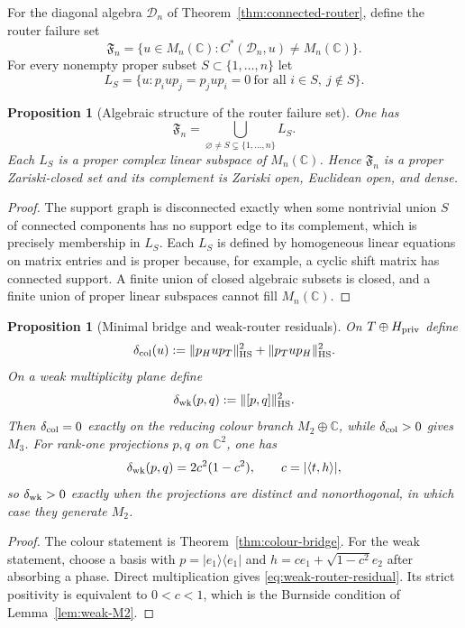 \documentclass[11pt]{article}
\newtheorem{proposition}[theorem]{Proposition}
\theoremstyle{definition}
\theoremstyle{remark}
\newcommand{\C}{\mathbb C}
\newcommand{\HS}{\mathrm{HS}}
\newcommand{\norm}[1]{\lVert#1\rVert}
\newcommand{\abs}[1]{\lvert#1\rvert}
\begin{document}
For the diagonal algebra $\mathcal D_n$ of
Theorem~\ref{thm:connected-router}, define the router failure set
\[
\mathfrak F_n
=
\{u\in M_n(\C):C^*(\mathcal D_n,u)\ne M_n(\C)\}.
\]
For every nonempty proper subset $S\subset\{1,\ldots,n\}$ let
\[
L_S
=
\{u:p_iup_j=p_jup_i=0\ \text{for all }i\in S,
\ j\notin S\}.
\]

\begin{proposition}[Algebraic structure of the router failure set]
\label{prop:router-failure-locus}
One has
\begin{equation}
\boxed{
\mathfrak F_n
=
\bigcup_{\varnothing\ne S\subsetneq\{1,\ldots,n\}}L_S.}
\label{eq:router-failure-locus}
\end{equation}
Each $L_S$ is a proper complex linear subspace of $M_n(\C)$.  Hence
$\mathfrak F_n$ is a proper Zariski-closed set and its complement is Zariski
open, Euclidean open, and dense.
\end{proposition}

\begin{proof}
The support graph is disconnected exactly when some nontrivial union $S$ of
connected components has no support edge to its complement, which is precisely
membership in $L_S$.  Each $L_S$ is defined by homogeneous linear equations
on matrix entries and is proper because, for example, a cyclic shift matrix
has connected support.  A finite union of closed algebraic subsets is closed,
and a finite union of proper linear subspaces cannot fill $M_n(\C)$.
\end{proof}

\begin{proposition}[Minimal bridge and weak-router residuals]
\label{prop:bridge-router-residuals}
On $T\oplus H_{\rm priv}$ define
\[
\delta_{\rm col}(u)
:=
\norm{p_Hup_T}_{\HS}^2+\norm{p_Tup_H}_{\HS}^2.
\]
On a weak multiplicity plane define
\[
\delta_{\rm wk}(p,q):=\norm{[p,q]}_{\HS}^2.
\]
Then $\delta_{\rm col}=0$ exactly on the reducing colour branch
$M_2\oplus\C$, while $\delta_{\rm col}>0$ gives $M_3$.  For rank-one
projections $p,q$ on $\C^2$, one has
\begin{equation}
\delta_{\rm wk}(p,q)
=2c^2(1-c^2),
\qquad c=\abs{\langle t,h\rangle},
\label{eq:weak-router-residual}
\end{equation}
so $\delta_{\rm wk}>0$ exactly when the projections are distinct and
nonorthogonal, in which case they generate $M_2$.
\end{proposition}

\begin{proof}
The colour statement is Theorem~\ref{thm:colour-bridge}.  For the weak
statement, choose a basis with $p=|e_1\rangle\langle e_1|$ and
$h=ce_1+\sqrt{1-c^2}e_2$ after absorbing a phase.  Direct multiplication gives
\eqref{eq:weak-router-residual}.  Its strict positivity is equivalent to
$0<c<1$, which is the Burnside condition of Lemma~\ref{lem:weak-M2}.
\end{proof}
\end{document}
